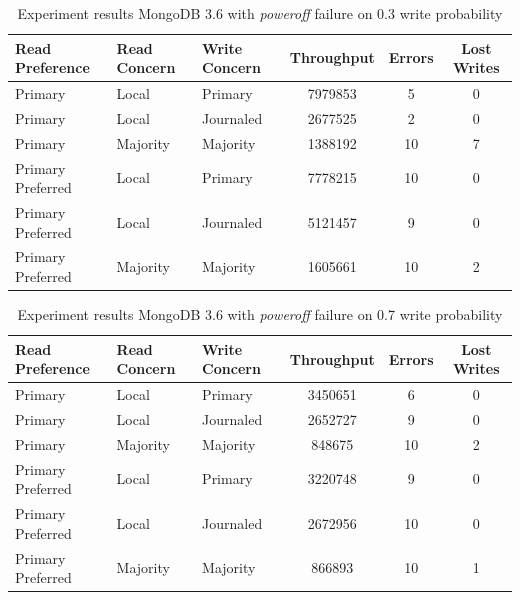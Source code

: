 \documentclass[12pt]{article}
\begin{document}
\begin{table}
    \begin{tabular}{@{}lllccc@{}}
      \hline
        Read Preference  & Read Concern & Write Concern & Throughput & Errors & Lost Writes \\
        \hline
        Primary          & Local        & Primary       & 7979853     & 5  & 0        \\
        Primary          & Local        & Journaled     & 2677525     & 2  & 0        \\
        Primary          & Majority     & Majority      & 1388192     & 10  & 7           \\
        Primary Preferred & Local        & Primary       & 7778215     & 10   & 0        \\
        Primary Preferred & Local        & Journaled     & 5121457     & 9    & 0         \\
        Primary Preferred & Majority     & Majority      & 1605661     & 10   & 2           \\
        \hline
        \end{tabular}
    \caption{Experiment results MongoDB 3.6 with \textit{poweroff} failure on 0.3 write probability}
\end{table}

\begin{table}
    \begin{tabular}{@{}lllccc@{}}
      \hline
        Read Preference  & Read Concern & Write Concern & Throughput & Errors & Lost Writes \\
        \hline
        Primary          & Local        & Primary       & 3450651     & 6  & 0        \\
        Primary          & Local        & Journaled     & 2652727     & 9  & 0        \\
        Primary          & Majority     & Majority      & 848675     & 10  & 2           \\
        Primary Preferred & Local        & Primary       & 3220748     & 9   & 0        \\
        Primary Preferred & Local        & Journaled     & 2672956     & 10    & 0         \\
        Primary Preferred & Majority     & Majority      & 866893     & 10   & 1           \\
        \hline
        \end{tabular}
    \caption{Experiment results MongoDB 3.6 with \textit{poweroff} failure on 0.7 write probability}
\end{table}
\end{document}
